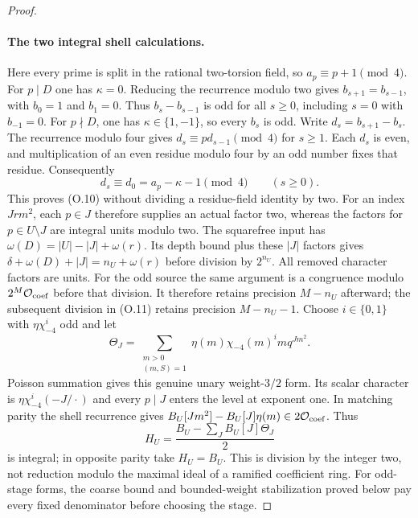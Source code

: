 \documentclass[11pt]{article}
\theoremstyle{definition}
\theoremstyle{remark}
\begin{document}
\begin{proof}
\paragraph{The two integral shell calculations.}
Here every prime is split in the rational two-torsion field, so
$a_p\equiv p+1\pmod4$. For $p\mid D$ one has $\kappa=0$.
Reducing the recurrence modulo two gives $b_{s+1}=b_{s-1}$,
with $b_0=1$ and $b_1=0$. Thus $b_s-b_{s-1}$ is odd for
all $s\ge0$, including $s=0$ with $b_{-1}=0$.
For $p\nmid D$, one has $\kappa\in\{1,-1\}$, so every $b_s$
is odd. Write $d_s=b_{s+1}-b_s$. The recurrence modulo four gives
$d_s\equiv p d_{s-1}\pmod4$ for $s\ge1$.
Each $d_s$ is even, and multiplication of an even residue modulo
four by an odd number fixes that residue. Consequently
\[
 d_s\equiv d_0=a_p-\kappa-1\pmod4\qquad(s\ge0).
\]
This proves (O.10) without dividing a residue-field identity by two.
For an index $Jrm^2$, each $p\in J$ therefore supplies an actual
factor two, whereas the factors for $p\in U\setminus J$ are integral
units modulo two. The squarefree input has
$\omega(D)=|U|-|J|+\omega(r)$. Its depth bound plus these $|J|$
factors gives
$\delta+\omega(D)+|J|=n_U+\omega(r)$ before division by
$2^{n_U}$. All removed character factors are units.
For the odd source the same argument is a congruence modulo
$2^M\mathcal O_{\rm coef}$ before that division. It therefore
retains precision $M-n_U$ afterward; the subsequent division
in (O.11) retains precision $M-n_U-1$.
Choose $i\in\{0,1\}$ with $\eta\chi_{-4}^i$ odd and let
\[
 \Theta_J=\sum_{\substack{m>0\\(m,S)=1}}
                      \eta(m)\chi_{-4}(m)^i m q^{Jm^2}.
\]
Poisson summation gives this genuine unary weight-$3/2$ form.
Its scalar character is $\eta\chi_{-4}^i(-J/\cdot)$ and every
$p\mid J$ enters the level at exponent one.
In matching parity the shell recurrence gives
$B_U[Jm^2]-B_U[J]\eta(m)\in2\mathcal O_{\rm coef}$.
Thus
\[
                 H_U=\frac{B_U-\sum_JB_U[J]\Theta_J}{2}          \tag{O.11}
\]
is integral; in opposite parity take $H_U=B_U$.
This is division by the integer two, not reduction modulo the
maximal ideal of a ramified coefficient ring. For odd-stage
forms, the coarse bound and bounded-weight stabilization proved
below pay every fixed denominator before choosing the stage.


\end{proof}
\end{document}
